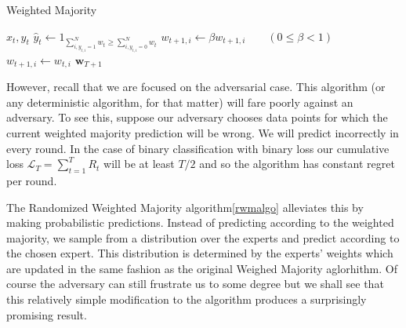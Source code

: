 \documentclass{article}
\begin{document}
\begin{algorithm}[H]
\caption{Weighted Majority}
\label{wmalgo}
\begin{algorithmic}[1]
\EndFor
{}
    \State {} $x_t , y_t$
    \State $\hat y_t \leftarrow 1_{\sum_{i, y_{t,i}=1}^N w_t \ge \sum_{i, y_{t,i}=0}^N w_t}$
                \State $w_{t+1,i} \leftarrow \beta w_{t+1,i} \quad\quad(0 \le \beta < 1)$
            \Else
                \State $w_{t+1,i} \leftarrow w_{t,i}$
            \EndIf
        \EndFor
    \EndIf
\EndFor
\State \Return $\textbf{w}_{T+1}$
\end{algorithmic}
\end{algorithm}

However, recall that we are focused on the adversarial case. This algorithm (or any deterministic algorithm, for that matter) will fare poorly against an adversary. To see this, suppose our adversary chooses data points for which the current weighted majority prediction will be wrong. We will predict incorrectly in every round. In the case of binary classification with binary loss our cumulative loss $\mathcal{L}_T = \sum_{t=1}^T R_t$ will be at least $T/2$ and so the algorithm has constant regret per round.

The Randomized Weighted Majority algorithm\autoref{rwmalgo} alleviates this by making probabilistic predictions. Instead of predicting according to the weighted majority, we sample from a distribution over the experts and predict according to the chosen expert. This distribution is determined by the experts' weights which are updated in the same fashion as the original Weighed Majority aglorhithm. Of course the adversary can still frustrate us to some degree but we shall see that this relatively simple modification to the algorithm produces a surprisingly promising result.
\end{document}

